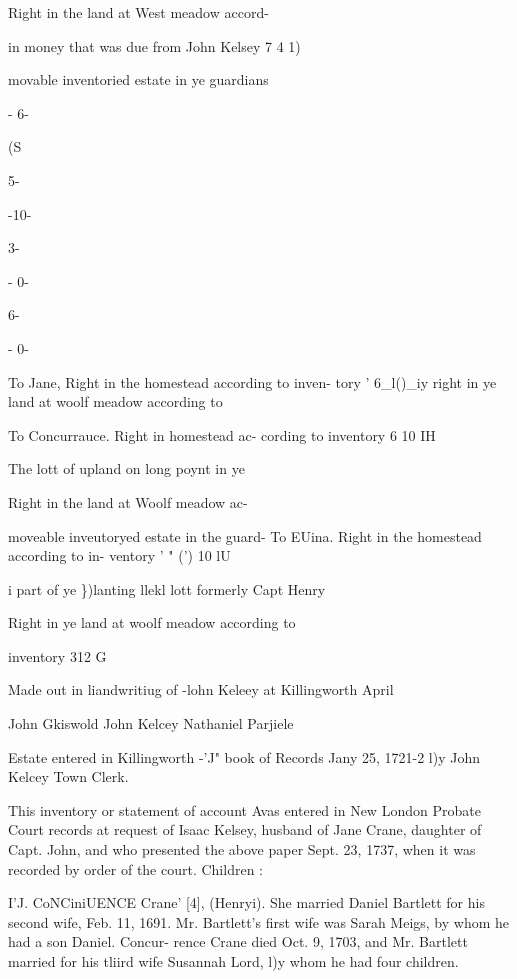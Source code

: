 \documentclass[oneside]{book}
\begin{document}
Right in the land at West meadow accord- 

in money that was due from John Kelsey 7  4  1) 


movable inventoried estate in ye guardians 






- 6- 


 (S 


5- 


-10- 




3- 


- 0- 




6- 


- 0- 





To Jane, Right in the homestead according to inven- 
tory ' 6\_l()\_iy 
right in ye land at woolf meadow according to 






To Concurrauce. Right in homestead ac- 
cording to inventory 6  10  IH 

The lott of upland on long poynt in ye 


Right in the land at Woolf meadow ac- 

moveable inveutoryed estate in the guard- 
To EUina. Right in the homestead according to in- 
ventory ' " (') 10 lU 

i part of ye \})lanting llekl lott formerly Capt Henry 


Right in ye land at woolf meadow according to 

inventory 312  G 


Made out in liandwritiug of -lohn Keleey at Killingworth April 

John Gkiswold 
John Kelcey 
Nathaniel Parjiele 

Estate entered in Killingworth -'J" book of Records Jany 25, 
1721-2 l)y John Kelcey Town Clerk. 

This inventory or statement of account Avas entered in New 
London Probate Court records at request of Isaac Kelsey, husband 
of Jane Crane, daughter of Capt. John, and who presented the 
above paper Sept. 23, 1737, when it was recorded by order of 
the court. Children : 







I'J. CoNCiniUENCE Crane' [4], (Henryi). She married Daniel 
Bartlett for his second wife, Feb. 11, 1691. Mr. Bartlett's first 
wife was Sarah Meigs, by whom he had a son Daniel. Concur- 
rence Crane died Oct. 9, 1703, and Mr. Bartlett married for his 
tliird wife Susannah Lord, l)y whom he had four children. 
\end{document}
